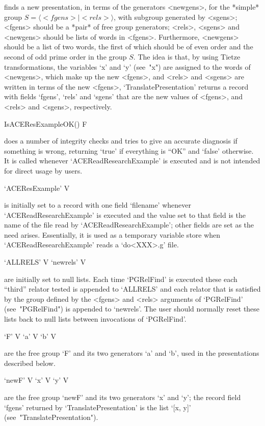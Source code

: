 finds a new presentation, in terms of the  generators  <newgens>,  for
the *simple* group $S = \langle <fgens>  \mid  <rels>  \rangle$,  with
subgroup generated by <sgens>; <fgens> should  be  a  *pair*  of  free
group generators; <rels>, <sgens> and <newgens>  should  be  lists  of
words in <fgens>. Furthermore, <newgens>  should  be  a  list  of  two
words, the first of which should be of even order and  the  second  of
odd prime order in the group $S$. The idea is that,  by  using  Tietze
transformations, the variables `x' and `y' (see~"x") are  assigned  to
the words of <newgens>, which make up the new <fgens>, and <rels>  and
<sgens>   are   written    in    terms    of    the    new    <fgens>,
`TranslatePresentation' returns a record with fields  `fgens',  `rels'
and `sgens' that are  the  new  values  of  <fgens>,  and  <rels>  and
<sgens>, respectively.

\>IsACEResExampleOK() F

does a number of integrity  checks  and  tries  to  give  an  accurate
diagnosis if something is wrong, returning  `true'  if  everything  is
``OK''   and   `false'    otherwise.    It    is    called    whenever
`ACEReadResearchExample' is executed and is not  intended  for  direct
usage by users.

\>`ACEResExample' V

is initially set to  a  record  with  one  field  `filename'  whenever
`ACEReadResearchExample' is executed and the value set to  that  field
is the name of the file read by `ACEReadResearchExample'; other fields
are set as the need arises. Essentially, it is  used  as  a  temporary
variable store when `ACEReadResearchExample' reads a `do<XXX>.g' file.

\>`ALLRELS' V
\>`newrels' V

are initially set to null lists. Each  time  `PGRelFind'  is  executed
these each ``third'' relator tested is appended to `ALLRELS' and  each
relator that is satisfied by the group  defined  by  the  <fgens>  and
<rels> arguments  of  `PGRelFind'  (see~"PGRelFind")  is  appended  to
`newrels'. The user should normally reset these  lists  back  to  null
lists between invocations of `PGRelFind'.

\>`F' V
\>`a' V
\>`b' V

are the free group `F' and its two generators `a' and `b', used in the
presentations described below.

\>`newF' V
\>`x' V
\>`y' V

are the free group `newF' and its two  generators  `x'  and  `y';  the
record field `fgens' returned by `TranslatePresentation' is  the  list
`[x, y]' (see~"TranslatePresentation").


